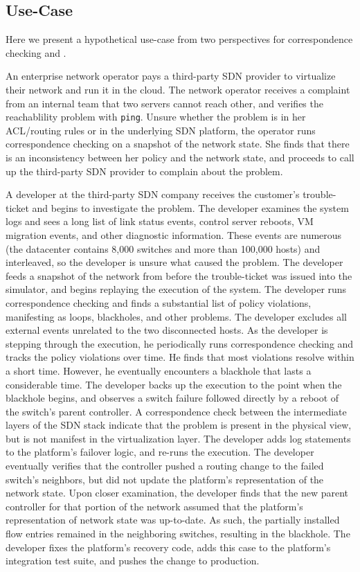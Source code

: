 \subsection{Use-Case}

Here we present a hypothetical use-case from two perspectives for correspondence checking and
\simulator{}.

 An enterprise network
operator pays a third-party SDN provider to virtualize their network
and run it in the cloud. The network operator receives a complaint
from an internal team that two servers cannot reach other, and 
verifies the reachablility problem with {\tt ping}. Unsure
whether the problem is in her ACL/routing rules 
or in the underlying SDN platform, the
operator runs correspondence checking on a snapshot of the network state. She
finds that there is an inconsistency between her policy and the network state, 
and proceeds to call up the third-party SDN provider to complain
about the problem.

 A developer at the third-party SDN
company receives the customer's trouble-ticket and begins to investigate the
problem. The developer examines the system logs and sees a
long list of link status events, control server reboots, VM migration events,
and other diagnostic information. These events are numerous (the
datacenter contains 8,000 switches and more than 100,000 hosts) and
interleaved, so the developer is unsure what caused the problem.
The developer feeds a snapshot of the network from before the
trouble-ticket was issued into the simulator, and
begins replaying the execution of the system. The developer runs
correspondence checking and finds a substantial list of policy violations,
manifesting as loops, blackholes, and other problems.
The developer excludes all external events
unrelated to the two disconnected hosts. As the developer is stepping through the execution, he periodically
runs correspondence checking and tracks the policy violations over time. He
finds that most violations resolve within a short time. However, he
eventually encounters a blackhole that lasts a considerable time. The
developer backs up the execution to the point when the blackhole begins, and
observes a switch failure followed directly by a reboot of the switch's parent
controller. A correspondence check between the intermediate layers of the SDN
stack indicate that the problem is present in the
physical view, but is not manifest in the virtualization layer. The developer adds log statements to the platform's failover
logic, and re-runs the execution. The developer eventually verifies that the
controller pushed a routing change to the failed switch's neighbors, but did
not update the platform's representation of the network state. Upon closer
examination, the developer finds that the new parent controller for that
portion of the network assumed that the platform's
representation of network state was up-to-date. As such, the partially installed flow entries remained
in the neighboring switches, resulting in the blackhole. The developer fixes
the platform's recovery code, adds this case to the platform's integration
test suite, and pushes the change to production. 

